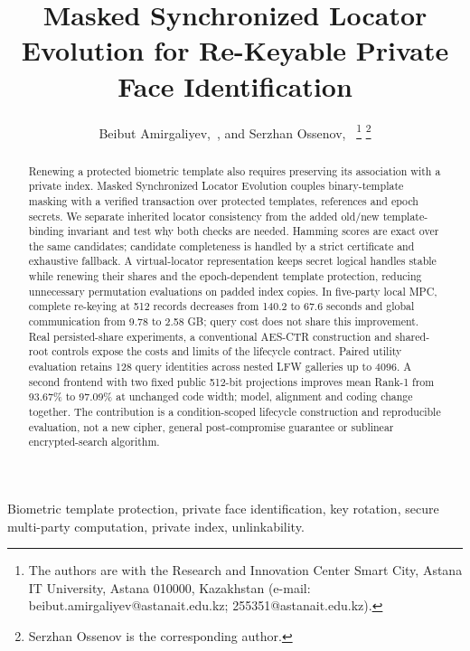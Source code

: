 \documentclass[journal]{IEEEtran}
\begin{document}
\title{Masked Synchronized Locator Evolution for Re-Keyable Private Face Identification}
\author{Beibut Amirgaliyev,~, and Serzhan Ossenov,~%
\thanks{The authors are with the Research and Innovation Center Smart City, Astana IT University, Astana 010000, Kazakhstan (e-mail: beibut.amirgaliyev@astanait.edu.kz; 255351@astanait.edu.kz).}%
\thanks{Serzhan Ossenov is the corresponding author.}}
\maketitle
\begin{abstract}
Renewing a protected biometric template also requires preserving its association with a private index. Masked Synchronized Locator Evolution couples binary-template masking with a verified transaction over protected templates, references and epoch secrets. We separate inherited locator consistency from the added old/new template-binding invariant and test why both checks are needed. Hamming scores are exact over the same candidates; candidate completeness is handled by a strict certificate and exhaustive fallback. A virtual-locator representation keeps secret logical handles stable while renewing their shares and the epoch-dependent template protection, reducing unnecessary permutation evaluations on padded index copies. In five-party local MPC, complete re-keying at 512 records decreases from 140.2 to 67.6 seconds and global communication from 9.78 to 2.58 GB; query cost does not share this improvement. Real persisted-share experiments, a conventional AES-CTR construction and shared-root controls expose the costs and limits of the lifecycle contract. Paired utility evaluation retains 128 query identities across nested LFW galleries up to 4096. A second frontend with two fixed public 512-bit projections improves mean Rank-1 from 93.67\% to 97.09\% at unchanged code width; model, alignment and coding change together. The contribution is a condition-scoped lifecycle construction and reproducible evaluation, not a new cipher, general post-compromise guarantee or sublinear encrypted-search algorithm.
\end{abstract}
\begin{IEEEkeywords}
Biometric template protection, private face identification, key rotation, secure multi-party computation, private index, unlinkability.
\end{IEEEkeywords}
\end{document}
